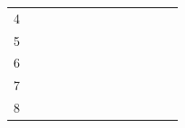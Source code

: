 \begin{table}[H]
\begin{tabular}{|c|cccccccccccc|}
        4        & \multicolumn{1}{c|}{}                         & \multicolumn{1}{c|}{}                         & \multicolumn{1}{c|}{}                         & \multicolumn{1}{c|}{}                         & \multicolumn{1}{c|}{}                         & \multicolumn{1}{c|}{\cellcolor[HTML]{000000}} & \multicolumn{1}{c|}{\cellcolor[HTML]{000000}} & \multicolumn{1}{c|}{}                         & \multicolumn{1}{c|}{}                         & \multicolumn{1}{c|}{}                         & \multicolumn{1}{c|}{}                         &              \\ \cline{2-13} 
        5        & \multicolumn{1}{c|}{}                         & \multicolumn{1}{c|}{}                         & \multicolumn{1}{c|}{}                         & \multicolumn{1}{c|}{}                         & \multicolumn{1}{c|}{}                         & \multicolumn{1}{c|}{}                         & \multicolumn{1}{c|}{\cellcolor[HTML]{000000}} & \multicolumn{1}{c|}{}                         & \multicolumn{1}{c|}{}                         & \multicolumn{1}{c|}{}                         & \multicolumn{1}{c|}{}                         &              \\ \cline{2-13} 
        6        & \multicolumn{1}{c|}{}                         & \multicolumn{1}{c|}{}                         & \multicolumn{1}{c|}{}                         & \multicolumn{1}{c|}{}                         & \multicolumn{1}{c|}{}                         & \multicolumn{1}{c|}{}                         & \multicolumn{1}{c|}{}                         & \multicolumn{1}{c|}{\cellcolor[HTML]{000000}} & \multicolumn{1}{c|}{}                         & \multicolumn{1}{c|}{}                         & \multicolumn{1}{c|}{}                         &              \\ \cline{2-13} 
        7        & \multicolumn{1}{c|}{}                         & \multicolumn{1}{c|}{}                         & \multicolumn{1}{c|}{}                         & \multicolumn{1}{c|}{}                         & \multicolumn{1}{c|}{}                         & \multicolumn{1}{c|}{}                         & \multicolumn{1}{c|}{}                         & \multicolumn{1}{c|}{}                         & \multicolumn{1}{c|}{\cellcolor[HTML]{000000}} & \multicolumn{1}{c|}{}                         & \multicolumn{1}{c|}{}                         &              \\ \cline{2-13} 
        8        & \multicolumn{1}{c|}{}                         & \multicolumn{1}{c|}{}                         & \multicolumn{1}{c|}{}                         & \multicolumn{1}{c|}{}                         & \multicolumn{1}{c|}{}                         & \multicolumn{1}{c|}{}                         & \multicolumn{1}{c|}{}                         & \multicolumn{1}{c|}{}                         & \multicolumn{1}{c|}{}                         & \multicolumn{1}{c|}{\cellcolor[HTML]{000000}} & \multicolumn{1}{c|}{\cellcolor[HTML]{000000}} &              \\ \hline
        \end{tabular}
        \end{table}
       
